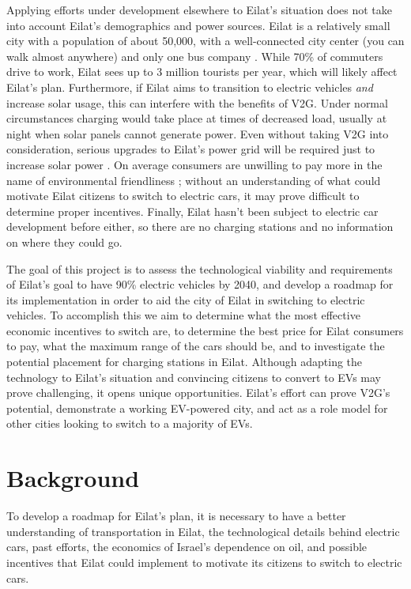 \documentclass[12pt]{article}                         %
\begin{document}
Applying efforts under development elsewhere to Eilat's situation does not take into account Eilat's demographics and power sources. Eilat is a relatively small city with a population of about 50,000, with a well-connected city center (you can walk almost anywhere) and only one bus company \cite{TransportationEilat}. While 70\% of commuters drive to work, Eilat sees up to 3 million tourists per year, which will likely affect Eilat's plan. Furthermore, if Eilat aims to transition to electric vehicles \textit{and} increase solar usage, this can interfere with the benefits of V2G. Under normal circumstances charging would take place at times of decreased load, usually at night when solar panels cannot generate power. Even without taking V2G into consideration, serious upgrades to Eilat's power grid will be required just to increase solar power \cite{Vardimon2011AssessmentIsrael}. On average consumers are unwilling to pay more in the name of environmental friendliness \cite{Mock2010MarketVehicles}; without an understanding of what could motivate Eilat citizens to switch to electric cars, it may prove difficult to determine proper incentives. Finally, Eilat hasn't been subject to electric car development before either, so there are no charging stations and no information on where they could go.

The goal of this project is to assess the technological viability and requirements of Eilat's goal to have 90\% electric vehicles by 2040, and develop a roadmap for its implementation in order to aid the city of Eilat in switching to electric vehicles. To accomplish this we aim to determine what the most effective economic incentives to switch are, to determine the best price for Eilat consumers to pay, what the maximum range of the cars should be, and to investigate the potential placement for charging stations in Eilat. Although adapting the technology to Eilat's situation and convincing citizens to convert to EVs may prove challenging, it opens unique opportunities. Eilat's effort can prove V2G's potential, demonstrate a working EV-powered city, and act as a role model for other cities looking to switch to a majority of EVs.

\newpage
\section{Background}
To develop a roadmap for Eilat's plan, it is necessary to have a better understanding of transportation in Eilat, the technological details behind electric cars, past efforts, the economics of Israel's dependence on oil, and possible incentives that Eilat could implement to motivate its citizens to switch to electric cars.
\end{document}
